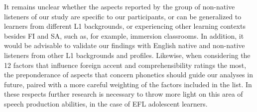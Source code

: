 \documentclass[12pt]{article}
\newenvironment{styleStandard}{\setlength\leftskip{0cm}\setlength\rightskip{0cm plus 1fil}\setlength\parindent{0cm}\setlength\parfillskip{0pt plus 1fil}\setlength\parskip{0in plus 1pt}\writerlistparindent\writerlistleftskip\leavevmode\normalfont\normalsize\writerlistlabel\ignorespaces}{\unskip\vspace{0.111in plus 0.0111in}\par}
\newcommand\writerlistleftskip{}
\newcommand\writerlistparindent{}
\newcommand\writerlistlabel{}
\begin{document}
\begin{styleStandard}
It remains unclear whether the aspects reported by the group of non-native listeners of our study are specific to our participants, or can be generalized to learners from different L1 backgrounds, or experiencing other learning contexts besides FI and SA, such as, for example, immersion classrooms. In addition, it would be advisable to validate our findings with English native and non-native listeners from other L1 backgrounds and profiles. Likewise, when considering the 12 factors that influence foreign accent and comprehensibility ratings the most, the preponderance of aspects that concern phonetics should guide our analyses in future, paired with a more careful weighting of the factors included in the list. In these respects further research is necessary to throw more light on this area of speech production abilities, in the case of EFL adolescent learners. 
\end{styleStandard}
\end{document}
